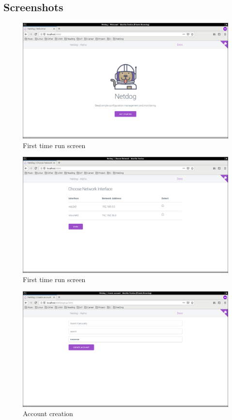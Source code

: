 \subsection{Screenshots}

\begin{figure}[H]
\includegraphics[scale=0.3]{first_time}
\caption{First time run screen}
\end{figure}

\begin{figure}[H]
\includegraphics[scale=0.3]{choose_network}
\caption{First time run screen}
\end{figure}

\begin{figure}[H]
\includegraphics[scale=0.3]{account_create}
\caption{Account creation}
\end{figure}

